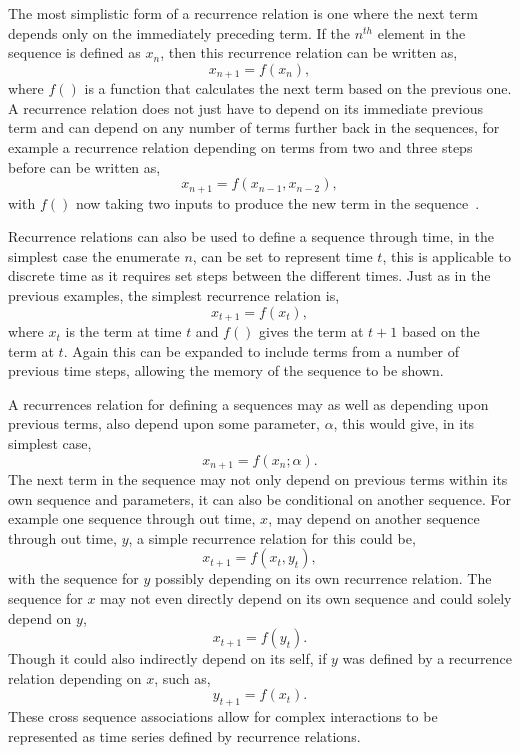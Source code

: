 \documentclass{article}
\begin{document}
The most simplistic form of a recurrence relation is one where the next term depends only on the immediately preceding term. If the $n^{th}$ element in the sequence is defined as  $x_{n}$, then this recurrence relation can be written as,    
\begin{equation}
x_{n+1} = f(x_{n}),
\end{equation}
where $f()$ is a function that calculates the next term based on the previous one. A recurrence relation does not just have to depend on its immediate previous term and can depend on any number of terms further back in the sequences, for example a recurrence relation depending on terms from two and three steps before can be written as, 
\begin{equation}
x_{n+1} = f(x_{n-1}, x_{n-2}),
\end{equation}
with $f()$ now taking two inputs to produce the new term in the sequence~\cite{recurrealtionwebpage}.

Recurrence relations can also be used to define a sequence through time, in the simplest case the enumerate $n$, can be set to represent time $t$, this is applicable to discrete time as it requires set steps between the different times. Just as in the previous examples, the simplest recurrence relation is,  
\begin{equation}
x_{t+1} = f(x_{t}),
\end{equation}
where $x_{t}$ is the term at time $t$ and $f()$ gives the term at $t+1$ based on the term at $t$. Again this can be expanded to include terms from a number of previous time steps, allowing the memory of the sequence to be shown.
 
A recurrences relation for defining a sequences may as well as depending upon previous terms, also depend upon some parameter, $\alpha$, this would give, in its simplest case, 
\begin{equation}
x_{n+1} = f(x_{n}; \alpha).
\end{equation}
The next term in the sequence may not only depend on previous terms within its own sequence and parameters, it can also be conditional on another sequence. For example one sequence through out time, $x$, may depend on another sequence through out time, $y$, a simple recurrence relation for this could be,
\begin{equation}
x_{t+1} = f(x_{t}, y_{t}),
\end{equation}
with the sequence for $y$ possibly depending on its own recurrence relation. The sequence for $x$ may not even directly depend on its own sequence and could solely depend on $y$, 
\begin{equation}
x_{t+1} = f(y_{t}).
\end{equation}
Though it could also indirectly depend on its self, if $y$ was defined by a recurrence relation depending on $x$, such as, 
\begin{equation}
y_{t+1} = f(x_{t}).
\end{equation}
These cross sequence associations allow for complex interactions to be represented as time series defined by recurrence relations.
\end{document}
